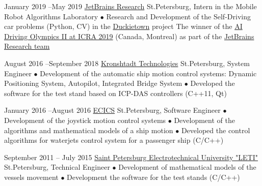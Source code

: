 \documentclass[11pt,a4paper]{moderncv}
\def\mark{{\small$\bullet$} }
\begin{document}
\cventry
    {January 2019 --\newline May 2019} %
    {\href{https://research.jetbrains.org/groups/robolab} {JetBrains Research}}
    {St.Petersburg, Intern in the Mobile Robot Algorithms Laboratory}
    {}
    {}
    {
        \mark Research and Development of the Self-Driving car problems (Python, CV) in the
        {\href{https://www.duckietown.org/archives/37690}{Duckietown}} project
        \newline \mark The winner of the {\href{https://www.icra2019.org/competitions/ai-driving-olympics-ai-do}
        {AI Driving Olympics II at ICRA 2019}} (Canada, Montreal) as part of the
        \href{https://www.facebook.com/JetBrains/posts/team-jbrrussia-representing-jetbrains-research-wins-ai-driving-olympics-at-ieee-/2329575487065692/}
        {JetBrains Research team}
    }

\cventry
    {August 2016 --\newline September 2018} %
    {\href{https://kronshtadt.ru/}{Kronshtadt Technologies}}
    {St.Petersburg, System Engineer}
    {}
    {}
    {
        \mark Development of the automatic ship motion control systems:
              Dynamic Positioning System, Autopilot, Integrated Bridge System
        \newline
        \mark Developed the software for the test stand based on ICP-DAS controllers (C++11, Qt)
    }

\cventry
    {January 2016 --\newline August 2016} %
    {\href{http://www.ec-ics.ru/}{ECICS}}
    {St.Petersburg, Software Engineer}
    {}
    {}
    {
        \mark Development of the joystick motion control systems
        \newline
        \mark Development of the algorithms and mathematical models of a ship motion
        \newline
        \mark Developed the control algorithms for waterjets control system for a passenger ship (C/C++)
    }

\cventry
    {September 2011 -- July 2015} %
    {\href{https://etu.ru/en/university/}{Saint Petersburg Electrotechnical University "LETI"}}
    {\newline St.Petersburg, Technical Engineer}
    {}
    {}
    {
        \mark Development of mathematical models of the vessels movement
        \newline
        \mark Development the software for the test stands (C/C++)
    }
\end{document}
